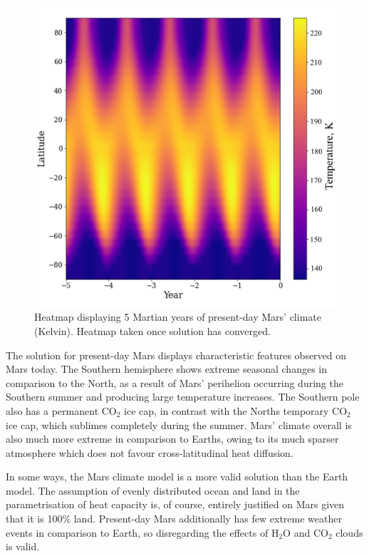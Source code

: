 \documentclass[12pt,onecolumn]{revtex4-2}    %
\begin{document}
\begin{figure}[h]
\centering
\includegraphics[width = 14cm]{Mars5yrsHeatmapNew.png}
\caption{Heatmap displaying 5 Martian years of present-day Mars' climate (Kelvin). Heatmap taken once solution has converged.}
\label{fig:test}
\end{figure}

The solution for present-day Mars displays characteristic features observed on Mars today. The Southern hemisphere shows extreme seasonal changes in comparison to the North, as a result of Mars' perihelion occurring during the Southern summer and producing large temperature increases. The Southern pole also has a permanent $\mathrm{CO_2}$ ice cap, in contrast with the Norths temporary $\mathrm{CO_2}$ ice cap, which sublimes completely during the summer. Mars' climate overall is also much more extreme in comparison to Earths, owing to its much sparser atmosphere which does not favour cross-latitudinal heat diffusion.

In some ways, the Mars climate model is a more valid solution than the Earth model. The assumption of evenly distributed ocean and land in the parametrisation of heat capacity is, of course, entirely justified on Mars given that it is 100\% land. Present-day Mars additionally has few extreme weather events in comparison to Earth, so disregarding the effects of $\mathrm{H_2 O}$ and $\mathrm{CO_2}$ clouds is valid.
\end{document}
